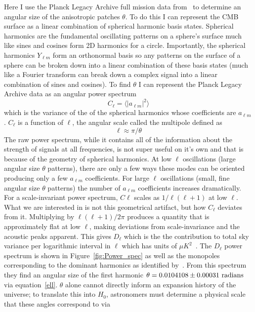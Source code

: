 \documentclass[11pt,twocolumn]{article}
\begin{document}
Here I use the Planck Legacy Archive full mission data from~\cite{Planck2018-Data} to determine an angular size of the anisotropic patches $\theta$. To do this I can represent the CMB surface as a linear combination of spherical harmonic basis states. Spherical harmonics are the fundamental oscillating patterns on a sphere's surface much like sines and cosines form 2D harmonics for a circle. Importantly, the spherical harmonics $Y_{\ell m}$ form an orthonormal basis so any patterns on the surface of a sphere can be broken down into a linear combination of these basis states (much like a Fourier transform can break down a complex signal into a linear combination of sines and cosines). To find $\theta$ I can represent the Planck Legacy Archive data as an angular power spectrum 
\begin{equation}
    C_\ell = \langle| a_{\ell m}|^2\rangle
\end{equation}
which is the variance of the of the spherical harmonics whose coefficients are $a_{\ell m}$. $C_\ell$ is a function of $\ell$, the angular scale called the multipole defined as
\begin{equation}\label{ell}
    \ell \approx \pi/\theta
\end{equation}
The raw power spectrum, while it contains all of the information about the strength of signals at all frequencies, is not super useful on it's own and that is because of the geometry of spherical harmonics. At low $\ell$ oscillations (large angular size $\theta$ patterns), there are only a few ways these modes can be oriented producing only a few $a_{\ell m}$ coefficients. For large $\ell$ oscillations (small, fine angular size $\theta$ patterns) the number of $a_{\ell m}$ coefficients increases dramatically. For a scale-invariant power spectrum, $C\ell$ scales as $1/\ell(\ell+1)$ at low $\ell$. What we are interested in is not this geometrical artifact, but how $C_\ell$ deviates from it. Multiplying by $\ell(\ell+1)/2\pi$ produces a quantity that is approximately flat at low $\ell$, making deviations from scale-invariance and the acoustic peaks apparent. This gives $D_\ell$ which is the the contribution to total sky variance per logarithmic interval in $\ell$ which has units of $\mu K^2$~\citep{Planck2018-Parameters}. The $D_\ell$ power spectrum is shown in Figure~\ref{fig:Power_spec} as well as the monopoles corresponding to the dominant harmonics as identified by~\cite{Planck2018-Parameters}. From this spectrum they find an angular size of the first harmonic $\theta = 0.0104108 \pm 0.00031 \ \rm radians$ via equation~\ref{ell}. $\theta$ alone cannot directly inform an expansion history of the universe; to translate this into $H_0$, astronomers must determine a physical scale that these angles correspond to via
\end{document}
